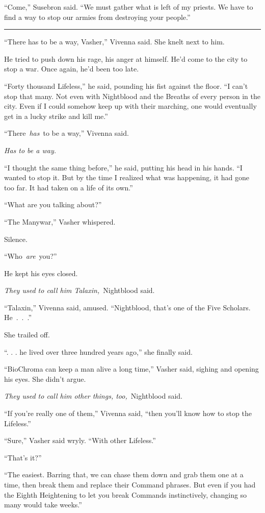 “Come,” Susebron said. “We must gather what is left of my priests. We have to find a way to stop our armies from destroying your people.”

\bigskip \hrule \bigskip

“There has to be a way, Vasher,” Vivenna said. She knelt next to him.

He tried to push down his rage, his anger at himself. He’d come to the city to stop a war. Once again, he’d been too late.

“Forty thousand Lifeless,” he said, pounding his fist against the floor. “I can’t stop that many. Not even with Nightblood and the Breaths of every person in the city. Even if I could somehow keep up with their marching, one would eventually get in a lucky strike and kill me.”

“There~\textit{has}~to be a way,” Vivenna said.

\textit{Has to be a way.}

“I thought the same thing before,” he said, putting his head in his hands. “I wanted to stop it. But by the time I realized what was happening, it had gone too far. It had taken on a life of its own.”

“What are you talking about?”

“The Manywar,” Vasher whispered.

Silence.

“Who~\textit{are}~you?”

He kept his eyes closed.

\textit{They used to call him Talaxin,}~Nightblood said.

“Talaxin,” Vivenna said, amused. “Nightblood, that’s one of the Five Scholars. He~.~.~.”

She trailed off.

“. . . he lived over three hundred years ago,” she finally said.

“BioChroma can keep a man alive a long time,” Vasher said, sighing and opening his eyes. She didn’t argue.

\textit{They used to call him other things, too,}~Nightblood said.

“If you’re really one of them,” Vivenna said, “then you’ll know how to stop the Lifeless.”

“Sure,” Vasher said wryly. “With other Lifeless.”

“That’s it?”

“The easiest. Barring that, we can chase them down and grab them one at a time, then break them and replace their Command phrases. But even if you had the Eighth Heightening to let you break Commands instinctively, changing so many would take weeks.”

